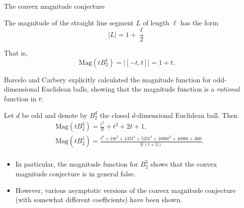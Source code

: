 \documentclass[12pt]{beamer}
\begin{document}
\begin{frame}[allowframebreaks]{The convex magnitude conjecture}
\framebreak

\begin{theorem}
The magnitude of the straight line segment $L$ of length $\ell$ has the form
\begin{equation*}
\vert L \vert = 1+\frac{\ell}{2}
\end{equation*}
\end{theorem}

That is,
\begin{equation*}
\text{Mag}\left(tB_2^1\right) = \big\vert [-t, t] \big\vert = 1 + t.
\end{equation*}

\framebreak

Barcelo and Carbery explicitly calculated the magnitude function for odd-dimensional Euclidean balls, showing that the magnitude function is a \emph{rational} function in $t$:

\begin{theorem}
Let $d$ be odd and denote by $B_2^d$ the closed $d$-dimensional Euclidean ball. Then
\begin{align*}\label{eqn:explicitmagfuns}
&\text{Mag}\left(tB_2^3\right) = \frac{t^3}{3!}+t^2+2t+1, \\
&\text{Mag}\left(tB_2^5\right) = \frac{t^6+18t^5+135t^4+525t^3+1080t^2+1080t+360}{5!(t+3)}. \\
\end{align*}
\end{theorem}

\begin{itemize}
\item In particular, the magnitude function for $B_2^5$ shows that the convex magnitude conjecture is in general false.
\item However, various asymptotic versions of the convex magnitude conjecture (with somewhat different coefficients) have been shown.
\end{itemize}

\end{frame}
\end{document}

